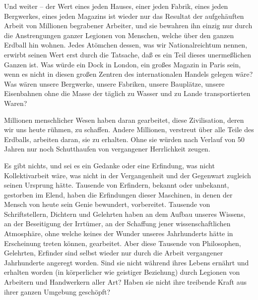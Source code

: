 \documentclass{scrbook}
\begin{document}
Und weiter – der Wert eines jeden Hauses, einer jeden Fabrik, eines jeden Bergwerkes, eines jeden Magazins ist wieder nur das Resultat der aufgehäuften Arbeit von Millionen begrabener Arbeiter, und sie bewahren ihn einzig nur durch die Anstrengungen ganzer Legionen von Menschen, welche über den ganzen Erdball hin wohnen. Jedes Atömchen dessen, was wir Nationalreichtum nennen, erwirbt seinen Wert erst durch die Tatsache, daß es ein Teil dieses unermeßlichen Ganzen ist. Was würde ein Dock in London, ein großes Magazin in Paris sein, wenn es nicht in diesen großen Zentren des internationalen Handels gelegen wäre? Was wären unsere Bergwerke, unsere Fabriken, unsere Bauplätze, unsere Eisenbahnen ohne die Masse der täglich zu Wasser und zu Lande transportierten Waren?

Millionen menschlicher Wesen haben daran gearbeitet, diese Zivilisation, deren wir uns heute rühmen, zu schaffen. Andere Millionen, verstreut über alle Teile des Erdballs, arbeiten daran, sie zu erhalten. Ohne sie würden nach Verlauf von 50 Jahren nur noch Schutthaufen von vergangener Herrlichkeit zeugen.

Es gibt nichts, und sei es ein Gedanke oder eine Erfindung, was nicht Kollektivarbeit wäre, was nicht in der Vergangenheit und der Gegenwart zugleich seinen Ursprung hätte. Tausende von Erfindern, bekannt oder unbekannt, gestorben im Elend, haben die Erfindungen dieser Maschinen, in denen der Mensch von heute sein Genie bewundert, vorbereitet. Tausende von Schriftstellern, Dichtern und Gelehrten haben an dem Aufbau unseres Wissens, an der Beseitigung der Irrtümer, an der Schaffung jener wissenschaftlichen Atmosphäre, ohne welche keines der Wunder unseres Jahrhunderts hätte in Erscheinung treten können, gearbeitet. Aber diese Tausende von Philosophen, Gelehrten, Erfinder sind selbst wieder nur durch die Arbeit vergangener Jahrhunderte angeregt worden. Sind sie nicht während ihres Lebens ernährt und erhalten worden (in körperlicher wie geistiger Beziehung) durch Legionen von Arbeitern und Handwerkern aller Art? Haben sie nicht ihre treibende Kraft aus ihrer ganzen Umgebung geschöpft?
\end{document}
